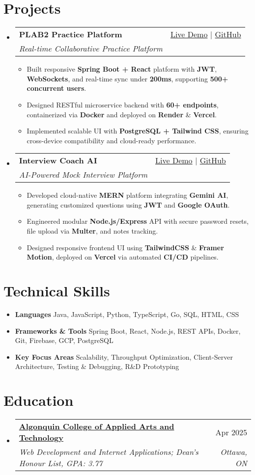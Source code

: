 \documentclass[letterpaper,11pt]{article}
\makeatletter
\newcommand{\resumeItem}[1]{\item\small{#1 \vspace{-2pt}}}
\newcommand{\resumeSubheading}[4]{
  \vspace{-1pt}\item
    \begin{tabular*}{0.97\textwidth}[t]{l@{\extracolsep{\fill}}r}
      \textbf{#1} & #2 \\
      \textit{\small#3} & \textit{\small #4} \\
    \end{tabular*}\vspace{-5pt}
}
\newcommand{\resumeSubHeadingListStart}{\begin{itemize}[leftmargin=*]}
\newcommand{\resumeSubHeadingListEnd}{\end{itemize}}
\newcommand{\resumeItemListStart}{\begin{itemize}}
\newcommand{\resumeItemListEnd}{\end{itemize}\vspace{-5pt}}
\makeatother
\begin{document}
\section{Projects}
  \resumeSubHeadingListStart
    \resumeSubheading
      {\textbf{PLAB2 Practice Platform}}{\href{https://plab2practice.com}{Live Demo} | \href{https://github.com/altansaid/plab2projectnew}{GitHub}}
      {Real-time Collaborative Practice Platform}{}
      \resumeItemListStart
        \resumeItem{Built responsive \textbf{Spring Boot + React} platform with \textbf{JWT}, \textbf{WebSockets}, and real-time sync under \textbf{200ms}, supporting \textbf{500+ concurrent users}.}
        \resumeItem{Designed RESTful microservice backend with \textbf{60+ endpoints}, containerized via \textbf{Docker} and deployed on \textbf{Render} \& \textbf{Vercel}.}
        \resumeItem{Implemented scalable UI with \textbf{PostgreSQL + Tailwind CSS}, ensuring cross-device compatibility and cloud-ready performance.}
      \resumeItemListEnd

    \resumeSubheading
      {\textbf{Interview Coach AI}}{\href{https://interviewcoach-ai.vercel.app/}{Live Demo} | \href{https://github.com/altansaid/interviewcoach-ai}{GitHub}}
      {AI-Powered Mock Interview Platform}{}
      \resumeItemListStart
        \resumeItem{Developed cloud-native \textbf{MERN} platform integrating \textbf{Gemini AI}, generating customized questions using \textbf{JWT} and \textbf{Google OAuth}.}
        \resumeItem{Engineered modular \textbf{Node.js/Express} API with secure password resets, file upload via \textbf{Multer}, and notes tracking.}
        \resumeItem{Designed responsive frontend UI using \textbf{TailwindCSS} \& \textbf{Framer Motion}, deployed on \textbf{Vercel} via automated \textbf{CI/CD} pipelines.}
      \resumeItemListEnd
  \resumeSubHeadingListEnd

\section{Technical Skills}
  \resumeItemListStart
    \resumeItem{\textbf{Languages}}{Java, JavaScript, Python, TypeScript, Go, SQL, HTML, CSS}
    \resumeItem{\textbf{Frameworks \& Tools}}{Spring Boot, React, Node.js, REST APIs, Docker, Git, Firebase, GCP, PostgreSQL}
    \resumeItem{\textbf{Key Focus Areas}}{Scalability, Throughput Optimization, Client-Server Architecture, Testing \& Debugging, R\&D Prototyping}
  \resumeItemListEnd

\section{Education}
  \resumeSubHeadingListStart
    \resumeSubheading
      {\href{https://www.algonquincollege.com/sat/program/web-development-internet-applications/}{Algonquin College of Applied Arts and Technology}}{Apr 2025}
      {Web Development and Internet Applications; Dean's Honour List, GPA: 3.77}{Ottawa, ON}
  \resumeSubHeadingListEnd
\end{document}
